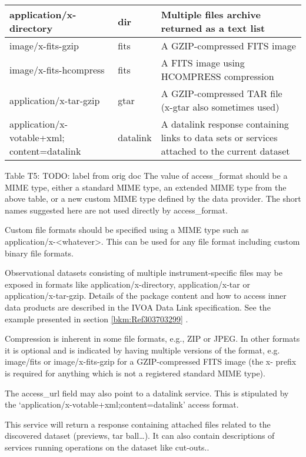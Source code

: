 \documentclass[11pt,a4paper]{ivoa}
\begin{document}
\begin{tabular}{|p{}|p{}|p{}|}
application/x-directory & dir & Multiple files archive returned as a text list \\\hline
image/x-fits-gzip & fits & A GZIP-compressed FITS image\\\hline
image/x-fits-hcompress & fits & A FITS image using HCOMPRESS compression\\\hline
application/x-tar-gzip & gtar & A GZIP-compressed TAR file (x-gtar also sometimes used)\\\hline
application/x-votable+xml; content=datalink & datalink & A datalink response containing links to  data sets or services attached to the current dataset\\\hline
\end{tabular}
\label{bkm:Ref286578377}Table T5: TODO: label from orig doc
The value of access\_format should be a MIME type, either a standard MIME type, an extended MIME type from the above
table, or a new custom MIME type defined by the data provider.  The short names suggested here are not used directly by
access\_format.

Custom file formats should be specified using a MIME type such as
{\textquotedbl}application/x-{\textless}whatever{\textgreater}{\textquotedbl}.  This can be used for any file format
including custom binary file formats.

Observational datasets consisting of multiple instrument-specific files may be exposed in formats like
application/x-directory, application/x-tar or application/x-tar-gzip.  Details of the package content and how to access
inner data products are described in the IVOA Data Link specification\cite{CITATIONPat15l1036}. See the example
presented in section \ref{bkm:Ref303703299} .

Compression is inherent in some file formats, e.g., ZIP or JPEG.  In other formats it is optional and is indicated by
having multiple versions of the format, e.g. image/fits or image/x-fits-gzip for a GZIP-compressed FITS image (the
{\textquotedbl}x-{\textquotedbl} prefix is required for anything which is not a registered standard MIME type).

The access\_url field may also point to a datalink service. This is stipulated by the
`application/x-votable+xml;content=datalink' access format. 

This service will return a response containing attached files related to the discovered dataset (previews, tar
ball{\dots}).  It can also contain descriptions of services running operations on the dataset like cut-outs..
\end{document}
